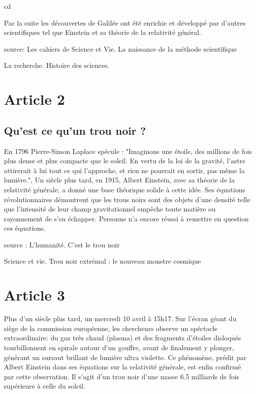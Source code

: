cd\documentclass{article}
\begin{document}
Par la suite les découvertes de Galilée ont été enrichie et développé par d'autres scientifiques tel que Einstein et sa théorie de la relativité général.

source: Les cahiers de Science et Vie. La naissance de la méthode scientifique

        La recherche. Histoire des sciences.

\label{sec:article1} %

\section{Article 2} 
\subsection{Qu'est ce qu'un trou noir ?}
En 1796 Pierre-Simon Laplace spécule : "Imaginons une étoile, des millions de fois plus dense et plus compacte que le soleil. En vertu de la loi de la gravité, l'astre attirerait à lui tout ce qui l'approche, et rien ne pourrait en sortir, pas même la lumière.", Un siècle plus tard, en 1915, Albert Einstein, avec sa théorie de la relativité générale, a donné une base théorique solide à cette idée. Ses équations révolutionnaires démontrent que les trous noirs sont des objets d'une densité telle que l'intensité de leur champ gravitationnel empêche toute matière ou rayonnement de s'en échapper. Personne n'a encore réussi à remettre en question ces équations.

source : L'humanité. C'est le trou noir

Science et vie. Trou noir extrémal : le nouveau monstre cosmique

\label{sec:article2} %

\section{Article 3}%

Plus d'un siècle plus tard, un mercredi 10 avril à 15h17. Sur l'écran géant du siège de la commission européenne, les chercheurs observe un spéctacle extraordinaire: du gaz très chaud (plasma) et des fragments d'étoiles disloqués tourbillonnent en spirale autour d'un gouffre, avant de finalement y plonger, générant un sursaut brillant de lumière ultra violette. Ce phénomène, prédit par Albert Einstein dans ses équations sur la relativité générale, est enfin confirmé par cette observation. Il s'agit d'un trou noir d'une masse 6.5 milliards de fois supérieure à celle du soleil.
\end{document}
